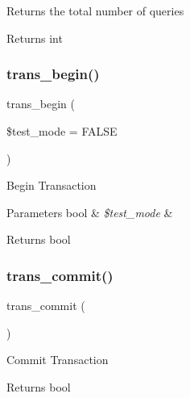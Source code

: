 Returns the total number of queries

\begin{DoxyReturn}{Returns}
int 
\end{DoxyReturn}
\mbox{\label{class_c_i___d_b__driver_a90e153cf190d273336d77cce930587e1}} 
\subsubsection{\texorpdfstring{trans\+\_\+begin()}{trans\_begin()}}
{\footnotesize\ttfamily trans\+\_\+begin (\begin{DoxyParamCaption}\item[{}]{\$test\+\_\+mode = {\ttfamily FALSE} }\end{DoxyParamCaption})}

Begin Transaction


\begin{DoxyParams}[1]{Parameters}
bool & {\em \$test\+\_\+mode} & \\
\hline
\end{DoxyParams}
\begin{DoxyReturn}{Returns}
bool 
\end{DoxyReturn}
\mbox{\label{class_c_i___d_b__driver_af4fbdcdace4aa94a139b64877601fe9b}} 
\subsubsection{\texorpdfstring{trans\+\_\+commit()}{trans\_commit()}}
{\footnotesize\ttfamily trans\+\_\+commit (\begin{DoxyParamCaption}{ }\end{DoxyParamCaption})}

Commit Transaction

\begin{DoxyReturn}{Returns}
bool 
\end{DoxyReturn}
\mbox{\label{class_c_i___d_b__driver_aa0edd209de428801ce5faa1fe740852e}} 
